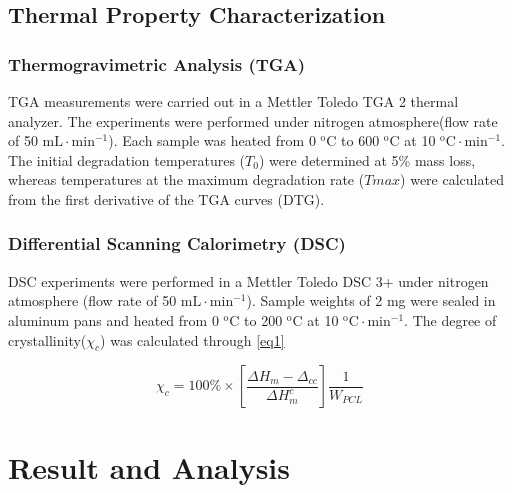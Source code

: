 \documentclass{article}%
\begin{document}
  \subsection{Thermal Property Characterization} %
  \label{sub:thermal_property_characterization}
    \subsubsection{Thermogravimetric Analysis (TGA)}
    TGA measurements were carried out in a Mettler Toledo TGA 2 thermal analyzer. 
    The experiments were performed under nitrogen atmosphere(flow rate of 50 $\mathrm{mL\cdot min^{-1}}$). 
    Each sample was heated from 0 $\mathrm{^o C}$ to 600 $\mathrm{^o C}$ at 10 $\mathrm{^o C\cdot min^{-1}}$.
    The initial degradation temperatures ($T_0$) were determined at 5\% mass loss, whereas temperatures at the maximum degradation rate ($Tmax$) were calculated from the first derivative of the TGA curves (DTG).


    \subsubsection{Differential Scanning Calorimetry (DSC)}
    DSC experiments were performed in a Mettler Toledo DSC 3+ under nitrogen atmosphere (flow rate of 50 $\mathrm{mL\cdot min^{-1}}$). 
    Sample weights of 2 mg were sealed in aluminum pans and heated from 0 $\mathrm{^o C}$ to 200 $\mathrm{^o C}$ at 10 $\mathrm{^o C\cdot min^{-1}}$. 
    The degree of crystallinity($\chi_{c}$) was calculated through \autoref{eq1}
    
    \begin{equation}
      \chi_{c}=100\%\times[{}\frac{\Delta H_m -\Delta_{cc}}{\Delta H^c_m }]\frac{1}{W_{PCL}}
      \label{eq1}
    \end{equation}
  
  
  
   
  \label{sec:experiment}
  \section{Result and Analysis} %
\end{document}

